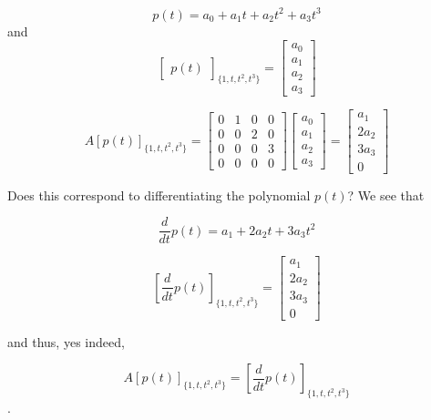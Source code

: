\documentclass[letterpaper]{article}
\begin{document}
    $$p(t) = a_0 + a_1 t + a_2 t^2 + a_3 t^3 $$
    and
    $$\begin{bmatrix}p(t)\end{bmatrix}_{ \{1, t, t^2, t^3\} } = \begin{bmatrix}a_0 \\ a_1 \\ a_2 \\ a_3  \end{bmatrix} $$

    $$ A [p(t)]_{ \{1, t, t^2, t^3\} } = \begin{bmatrix}0 & 1 & 0 & 0 \\ 0 & 0 & 2 & 0 \\ 0 & 0 & 0 & 3 \\ 0 & 0 & 0 & 0  \end{bmatrix} \begin{bmatrix}a_0 \\ a_1 \\ a_2 \\ a_3  \end{bmatrix} = \begin{bmatrix}a_1 \\ 2 a_2 \\ 3 a_3 \\ 0  \end{bmatrix} $$

    Does this correspond to differentiating the polynomial $p(t)$? We see that

    $$ \frac{d}{dt} p(t)  = a_1 + 2 a_2 t + 3 a_3 t^2 $$

    $$[\frac{d}{dt} p(t) ]_{ \{1, t, t^2, t^3\} } = \begin{bmatrix}a_1 \\ 2 a_2 \\ 3 a_3 \\ 0  \end{bmatrix}  $$

    and thus, yes indeed,

    $$ A [p(t)]_{ \{1, t, t^2, t^3\} } = [\frac{d}{dt}p(t)]_{ \{1, t, t^2, t^3\} } $$.
\end{document}
